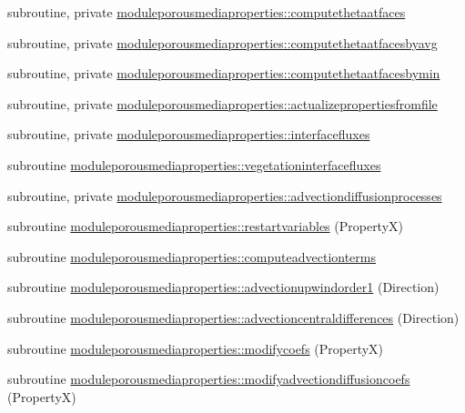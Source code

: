 \begin{DoxyCompactItemize}
\item 
subroutine, private \mbox{\hyperlink{namespacemoduleporousmediaproperties_a534ab2ca9e28f31cfce1876b53c263c8}{moduleporousmediaproperties\+::computethetaatfaces}}
\item 
subroutine, private \mbox{\hyperlink{namespacemoduleporousmediaproperties_ac3225dfdb6a7475838f45e43263a61a9}{moduleporousmediaproperties\+::computethetaatfacesbyavg}}
\item 
subroutine, private \mbox{\hyperlink{namespacemoduleporousmediaproperties_a14becd6de87b194f724f94c34247ee36}{moduleporousmediaproperties\+::computethetaatfacesbymin}}
\item 
subroutine, private \mbox{\hyperlink{namespacemoduleporousmediaproperties_a34afbe14179f6a786f5504a52ce2d220}{moduleporousmediaproperties\+::actualizepropertiesfromfile}}
\item 
subroutine, private \mbox{\hyperlink{namespacemoduleporousmediaproperties_a9754a9e3d41ba3152a613bda8646ffae}{moduleporousmediaproperties\+::interfacefluxes}}
\item 
subroutine \mbox{\hyperlink{namespacemoduleporousmediaproperties_a81fcc32210036b193860971be2aa8f12}{moduleporousmediaproperties\+::vegetationinterfacefluxes}}
\item 
subroutine, private \mbox{\hyperlink{namespacemoduleporousmediaproperties_ab176bef10683035ac59beb9b6b893728}{moduleporousmediaproperties\+::advectiondiffusionprocesses}}
\item 
subroutine \mbox{\hyperlink{namespacemoduleporousmediaproperties_afc91dc82442179a1d26d776a3a1007d6}{moduleporousmediaproperties\+::restartvariables}} (PropertyX)
\item 
subroutine \mbox{\hyperlink{namespacemoduleporousmediaproperties_af0fd7f987acaa1a952f02b3bdedf1b8a}{moduleporousmediaproperties\+::computeadvectionterms}}
\item 
subroutine \mbox{\hyperlink{namespacemoduleporousmediaproperties_ab1e6a246ea1f6819438e21e75cf2de59}{moduleporousmediaproperties\+::advectionupwindorder1}} (Direction)
\item 
subroutine \mbox{\hyperlink{namespacemoduleporousmediaproperties_a07904791ddeab6650d5a3ed4ee8eca5d}{moduleporousmediaproperties\+::advectioncentraldifferences}} (Direction)
\item 
subroutine \mbox{\hyperlink{namespacemoduleporousmediaproperties_adff3b6aa5d450f391ceaa763c275a82a}{moduleporousmediaproperties\+::modifycoefs}} (PropertyX)
\item 
subroutine \mbox{\hyperlink{namespacemoduleporousmediaproperties_aaeea83f4ec370391b45509fd7863a3bc}{moduleporousmediaproperties\+::modifyadvectiondiffusioncoefs}} (PropertyX)

\end{DoxyCompactItemize}
